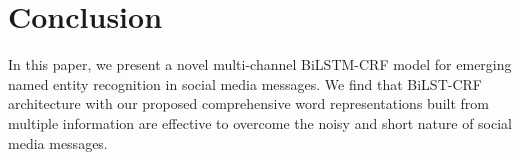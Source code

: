 \section{Conclusion}
In this paper, we present a novel multi-channel BiLSTM-CRF model for emerging named entity recognition in social media messages. 
We find that BiLST-CRF architecture with our proposed comprehensive word representations built from multiple information are effective to overcome the noisy and short nature of social media messages. 
\newpage